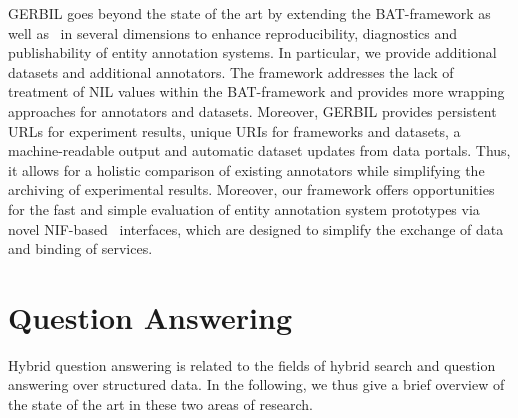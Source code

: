 GERBIL goes beyond the state of the art by extending the BAT-framework as well as~\cite{rizzo2014} in several dimensions to enhance reproducibility, diagnostics and publishability of entity annotation systems. In particular, we provide \numberOfadditionalDatasets additional datasets and \numberOfadditionalAnnotators additional annotators. The framework addresses the lack of treatment of NIL values within the BAT-framework and provides more wrapping approaches for annotators and datasets. Moreover, GERBIL provides persistent URLs for experiment results, unique URIs for frameworks and datasets, a machine-readable output and automatic dataset updates from data portals. Thus, it allows for a holistic comparison of existing annotators while simplifying the archiving of experimental results. Moreover, our framework offers opportunities for the fast and simple evaluation of entity annotation system prototypes via novel NIF-based~\cite{NIF} interfaces, which are designed to simplify the exchange of data and binding of services.


\section{Question Answering}
Hybrid question answering is related to the fields of hybrid search and question answering over structured data. In the following, we thus give a brief overview of the state of the art in these two areas of research.

